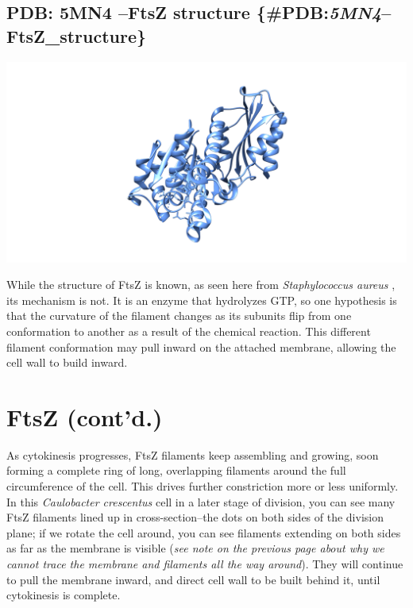 \documentclass[]{tufte-book}
\begin{document}
\subsection{\texorpdfstring{PDB: 5MN4 --FtsZ structure
\{\#PDB:\emph{5MN4}--FtsZ\_structure\}}{PDB: 5MN4 --FtsZ structure \{\#PDB:5MN4--FtsZ\_structure\}}}\label{pdb-5mn4-ftsz-structure-pdb5mn4ftsz_structure}

\includegraphics{img/schematics/5_9_1}

While the structure of FtsZ is known, as seen here from
\emph{Staphylococcus aureus} \citet{wagstaff2017}, its mechanism is not.
It is an enzyme that hydrolyzes GTP, so one hypothesis is that the
curvature of the filament changes as its subunits flip from one
conformation to another as a result of the chemical reaction. This
different filament conformation may pull inward on the attached
membrane, allowing the cell wall to build inward.

\section{FtsZ (cont'd.)}\label{ftsz-contd.}

As cytokinesis progresses, FtsZ filaments keep assembling and growing,
soon forming a complete ring of long, overlapping filaments around the
full circumference of the cell. This drives further constriction more or
less uniformly. In this \emph{Caulobacter crescentus} cell in a later
stage of division, you can see many FtsZ filaments lined up in
cross-section--the dots on both sides of the division plane; if we
rotate the cell around, you can see filaments extending on both sides as
far as the membrane is visible (\emph{see note on the previous page
about why we cannot trace the membrane and filaments all the way
around}). They will continue to pull the membrane inward, and direct
cell wall to be built behind it, until cytokinesis is complete.
\end{document}
